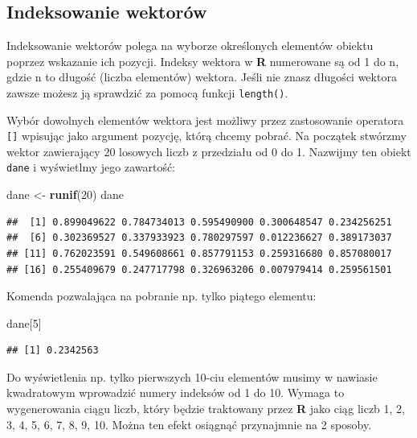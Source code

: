 \documentclass[]{book}
\newenvironment{Shaded}{\begin{snugshade}}{\end{snugshade}}
\newcommand{\KeywordTok}[1]{\textcolor[rgb]{0.13,0.29,0.53}{\textbf{#1}}}
\newcommand{\DecValTok}[1]{\textcolor[rgb]{0.00,0.00,0.81}{#1}}
\newcommand{\StringTok}[1]{\textcolor[rgb]{0.31,0.60,0.02}{#1}}
\newcommand{\NormalTok}[1]{#1}
\theoremstyle{definition}
\theoremstyle{definition}
\theoremstyle{definition}
\theoremstyle{remark}
\begin{document}
\subsection{Indeksowanie wektorów}\label{indeksowanie-wektorow}

Indeksowanie wektorów polega na wyborze określonych elementów obiektu
poprzez wskazanie ich pozycji. Indeksy wektora w \textbf{R} numerowane
są od 1 do n, gdzie n to długość (liczba elementów) wektora. Jeśli nie
znasz długości wektora zawsze możesz ją sprawdzić za pomocą funkcji
\texttt{length()}.

Wybór dowolnych elementów wektora jest możliwy przez zastosowanie
operatora \texttt{{[}{]}} wpisując jako argument pozycję, którą chcemy
pobrać. Na początek stwórzmy wektor zawierający 20 losowych liczb z
przedziału od 0 do 1. Nazwijmy ten obiekt \texttt{dane} i wyświetlmy
jego zawartość:

\begin{Shaded}
\begin{Highlighting}[]
\NormalTok{dane <-}\StringTok{ }\KeywordTok{runif}\NormalTok{(}\DecValTok{20}\NormalTok{)}
\NormalTok{dane}
\end{Highlighting}
\end{Shaded}

\begin{verbatim}
##  [1] 0.899049622 0.784734013 0.595490900 0.300648547 0.234256251
##  [6] 0.302369527 0.337933923 0.780297597 0.012236627 0.389173037
## [11] 0.762023591 0.549608661 0.857791153 0.259316680 0.857080017
## [16] 0.255409679 0.247717798 0.326963206 0.007979414 0.259561501
\end{verbatim}

Komenda pozwalająca na pobranie np. tylko piątego elementu:

\begin{Shaded}
\begin{Highlighting}[]
\NormalTok{dane[}\DecValTok{5}\NormalTok{]}
\end{Highlighting}
\end{Shaded}

\begin{verbatim}
## [1] 0.2342563
\end{verbatim}

Do wyświetlenia np. tylko pierwszych 10-ciu elementów musimy w nawiasie
kwadratowym wprowadzić numery indeksów od 1 do 10. Wymaga to
wygenerowania ciągu liczb, który będzie traktowany przez \textbf{R} jako
ciąg liczb 1, 2, 3, 4, 5, 6, 7, 8, 9, 10. Można ten efekt osiągnąć
przynajmnie na 2 sposoby.
\end{document}
